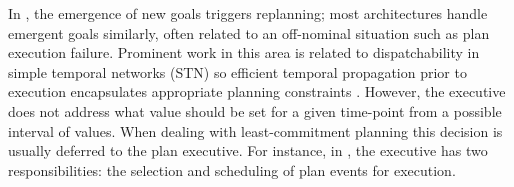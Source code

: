In \cite{lemai-chenevier2004}, the emergence of new goals triggers
replanning; most architectures handle emergent goals similarly, often
related to an off-nominal situation such as plan execution
failure. Prominent work in this area is related to dispatchability in
simple temporal networks (STN) so efficient temporal propagation prior
to execution encapsulates appropriate planning constraints
\cite{mus98a}.  %
However, the executive does not address what value should be set for a
given time-point from a possible interval of values.  When dealing
with least-commitment planning this decision is usually deferred to
the plan executive. For instance, in \cite{mus98c}, the executive has
two responsibilities: the selection and scheduling of plan events for
execution.%




